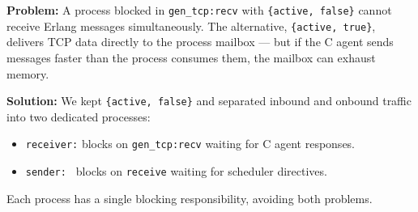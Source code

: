 \documentclass[12pt,a4paper]{article}
\begin{document}
\textbf{Problem:} A process blocked in \texttt{gen\_tcp:recv} with \texttt{\{active, false\}} cannot receive Erlang messages simultaneously.
The alternative, \texttt{\{active, true\}}, delivers TCP data directly to the process mailbox --- but if the C agent sends messages faster than the process consumes them, the mailbox can exhaust memory.

\textbf{Solution:} We kept \texttt{\{active, false\}} and separated inbound and onbound traffic into two dedicated processes:
\begin{itemize}
\item \texttt{receiver:} blocks on \texttt{gen\_tcp:recv} waiting for C agent responses.
\item \texttt{sender:  } blocks on \texttt{receive} waiting for scheduler directives.
\end{itemize}
Each process has a single blocking responsibility, avoiding both problems.
\end{document}
